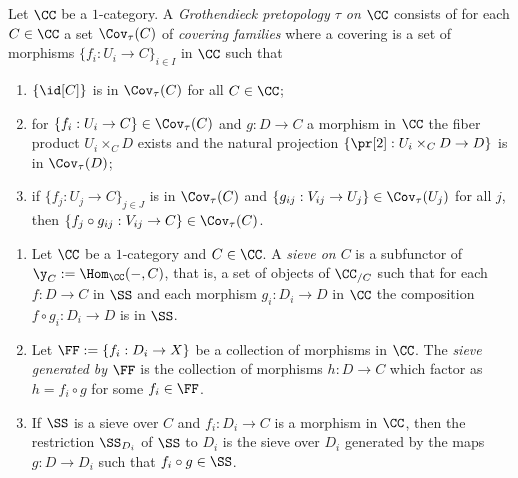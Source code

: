 \documentclass[12pt]{article}
\numberwithin{equation}{section}
\numberwithin{lemma}{section}
\numberwithin{theorem}{section}
\numberwithin{proposition}{section}
\numberwithin{corollary}{section}
\numberwithin{definition}{section}
\numberwithin{example}{section}
\numberwithin{remark}{section}
\begin{document}
\begin{definition}
  Let $\CC$ be a $1$-category. A \emph{Grothendieck pretopology $\tau$
    on $\CC$} consists of for each $C \in \CC$ a set $\Cov_{\tau}(C)$
  of \emph{covering families} where a covering is a set of morphisms
  $\{f_i : U_i \to C\}_{i \in I}$ in $\CC$ such that
  \begin{enumerate}[label=(\arabic*)]
  \item $\{\id[C]\}$ is in $\Cov_{\tau}(C)$ for all $C \in \CC$;
  \item for $\{f_i : U_i \to C\} \in \Cov_{\tau}(C)$ and $g : D \to C$
    a morphism in $\CC$ the fiber product $U_i \times_C D$ exists and
    the natural projection $\{\pr[2] : U_i \times_C D \to D\}$ is in
    $\Cov_{\tau}(D)$;
  \item if $\{f_j : U_j \to C\}_{j \in J}$ is in $\Cov_{\tau}(C)$ and
    $\{g_{ij} : V_{ij} \to U_j\} \in \Cov_{\tau}(U_j)$ for all $j$,
    then $\{f_j \circ g_{ij} : V_{ij} \to C\} \in \Cov_{\tau}(C)$.
  \end{enumerate}
\end{definition}

\begin{definition}
  \begin{enumerate}[label=(\arabic*)]
  \item Let $\CC$ be a $1$-category and $C \in \CC$. A \emph{sieve on
      $C$} is a subfunctor of $\y_C := \Hom_{\CC}(-, C)$, that is, a
    set of objects of $\CC_{/C}$ such that for each $f : D \to C$ in
    $\SS$ and each morphism $g_i : D_i \to D$ in $\CC$ the composition
    $f \circ g_i : D_i \to D$ is in $\SS$.
  \item Let $\FF := \{f_i : D_i \to X\}$ be a collection of morphisms
    in $\CC$. The \emph{sieve generated by $\FF$} is the collection of
    morphisms $h : D \to C$ which factor as $h = f_i \circ g$ for some
    $f_i \in \FF$.
  \item If $\SS$ is a sieve over $C$ and $f_i : D_i \to C$ is a
    morphism in $\CC$, then the restriction $\SS_{D_i}$ of $\SS$ to
    $D_i$ is the sieve over $D_i$ generated by the maps
    $g : D \to D_i$ such that $f_i \circ g \in \SS$.
  \end{enumerate}
\end{definition}
\end{document}
